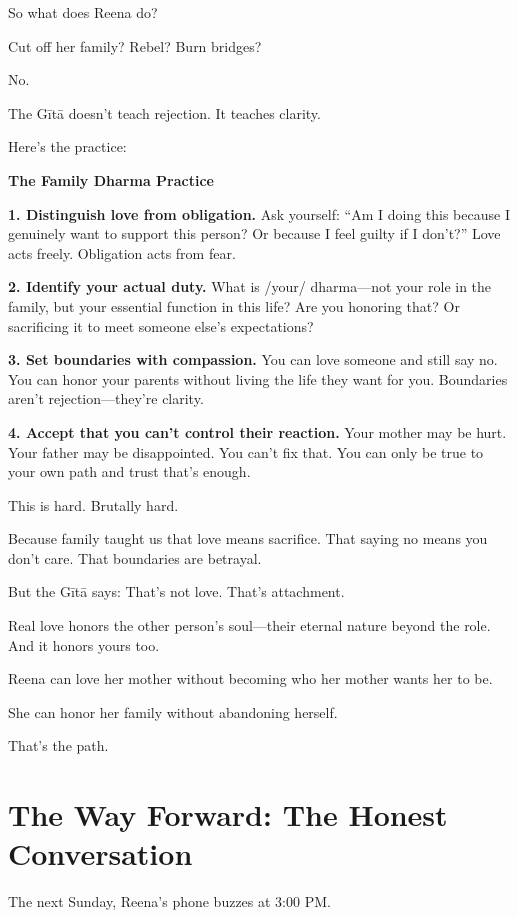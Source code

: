 \documentclass[11pt,twoside]{book}
\begin{document}
So what does Reena do?

Cut off her family? Rebel? Burn bridges?

No.

The Gītā doesn't teach rejection. It teaches clarity.

Here's the practice:

\begin{practicebox}
\textbf{The Family Dharma Practice}

\textbf{1. Distinguish love from obligation.}
Ask yourself: ``Am I doing this because I genuinely want to support this person? Or because I feel guilty if I don't?'' Love acts freely. Obligation acts from fear.

\textbf{2. Identify your actual duty.}
What is /your/ dharma—not your role in the family, but your essential function in this life? Are you honoring that? Or sacrificing it to meet someone else's expectations?

\textbf{3. Set boundaries with compassion.}
You can love someone and still say no. You can honor your parents without living the life they want for you. Boundaries aren't rejection—they're clarity.

\textbf{4. Accept that you can't control their reaction.}
Your mother may be hurt. Your father may be disappointed. You can't fix that. You can only be true to your own path and trust that's enough.
\end{practicebox}

This is hard. Brutally hard.

Because family taught us that love means sacrifice. That saying no means you don't care. That boundaries are betrayal.

But the Gītā says: That's not love. That's attachment.

Real love honors the other person's soul—their eternal nature beyond the role. And it honors yours too.

Reena can love her mother without becoming who her mother wants her to be.

She can honor her family without abandoning herself.

That's the path.

\section*{The Way Forward: The Honest Conversation}

The next Sunday, Reena's phone buzzes at 3:00 PM.
\end{document}
